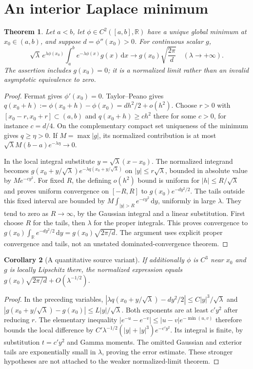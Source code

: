 \documentclass[11pt,oneside,a4paper]{book}
\newtheorem{theorem}{Theorem}[chapter]
\newtheorem{corollary}[theorem]{Corollary}
\theoremstyle{definition}
\theoremstyle{remark}
\newcommand{\R}{\mathbb R}
\newcommand{\dd}{\,\mathrm d}
\newcommand{\KEntry}[2]{\Needspace{7\baselineskip}\section{#2}\label{#1}{\small\sffamily\color{black!60}\detokenize{#1}}\par}
\begin{document}
\KEntry{K03.17.laplace_local}{An interior Laplace minimum}
\begin{theorem}
Let $a<b$, let $\phi\in C^2([a,b],\R)$ have a unique global minimum at
$x_0\in(a,b)$, and suppose $d=\phi''(x_0)>0$. For continuous scalar $g$,
\[
 \sqrt\lambda\,e^{\lambda\phi(x_0)}
 \int_a^b e^{-\lambda\phi(x)}g(x)\dd x
 \longrightarrow g(x_0)\sqrt{\frac{2\pi}{d}}
 \quad(\lambda\to+\infty).
\]
The assertion includes $g(x_0)=0$; it is a normalized limit rather than an
invalid asymptotic equivalence to zero.
\end{theorem}
\begin{proof}
Fermat gives $\phi'(x_0)=0$. Taylor--Peano gives
$q(x_0+h):=\phi(x_0+h)-\phi(x_0)=dh^2/2+o(h^2)$.
Choose $r>0$ with $[x_0-r,x_0+r]\subset(a,b)$ and
$q(x_0+h)\geq c h^2$ there for some $c>0$, for instance $c=d/4$.
On the complementary compact set uniqueness of the minimum gives
$q\geq\eta>0$. If $M=\max|g|$, its normalized contribution is at most
$\sqrt\lambda M(b-a)e^{-\lambda\eta}\to0$.

In the local integral substitute $y=\sqrt\lambda(x-x_0)$. The normalized
integrand becomes
$g(x_0+y/\sqrt\lambda)e^{-\lambda q(x_0+y/\sqrt\lambda)}$ on
$|y|\leq r\sqrt\lambda$, bounded in absolute value by $Me^{-cy^2}$.
For fixed $R$, the defining $o(h^2)$ bound is uniform for
$|h|\leq R/\sqrt\lambda$ and proves uniform convergence on $[-R,R]$ to
$g(x_0)e^{-dy^2/2}$. The tails outside this fixed interval are bounded by
$M\int_{|y|>R}e^{-cy^2}\dd y$, uniformly in large $\lambda$.
They tend to zero as $R\to\infty$, by the Gaussian integral and a linear
substitution. First choose $R$ for the tails, then $\lambda$ for the proper
integrals. This proves convergence to
$g(x_0)\int_\R e^{-dy^2/2}\dd y=g(x_0)\sqrt{2\pi/d}$.
The argument uses explicit proper convergence and tails, not an unstated
dominated-convergence theorem.
\end{proof}
\begin{corollary}[A quantitative source variant]
If additionally $\phi$ is $C^3$ near $x_0$ and $g$ is locally Lipschitz there,
the normalized expression equals
$g(x_0)\sqrt{2\pi/d}+O(\lambda^{-1/2})$.
\end{corollary}
\begin{proof}
In the preceding variables,
$|\lambda q(x_0+y/\sqrt\lambda)-dy^2/2|
 \leq C|y|^3/\sqrt\lambda$ and
$|g(x_0+y/\sqrt\lambda)-g(x_0)|\leq L|y|/\sqrt\lambda$.
Both exponents are at least $c'y^2$ after reducing $r$.
The elementary inequality $|e^{-u}-e^{-v}|\leq|u-v|e^{-\min(u,v)}$
therefore bounds the local difference by
$C'\lambda^{-1/2}(|y|+|y|^3)e^{-c'y^2}$.
Its integral is finite, by substitution $t=c'y^2$ and Gamma moments.
The omitted Gaussian and exterior tails are exponentially small in
$\lambda$, proving the error estimate. These stronger hypotheses are not
attached to the weaker normalized-limit theorem.
\end{proof}
\end{document}
